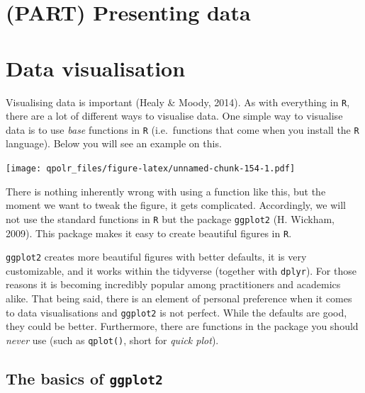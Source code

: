 \documentclass[12pt,oneside]{reedthesis}
\theoremstyle{definition}
\theoremstyle{definition}
\theoremstyle{definition}
\theoremstyle{remark}
\begin{document}
  \chapter*{(PART) Presenting data}\label{part-presenting-data}
  
  \chapter{Data visualisation}\label{dataviz}
  
  Visualising data is important (Healy \& Moody, 2014). As with everything
  in \texttt{R}, there are a lot of different ways to visualise data. One
  simple way to visualise data is to use \emph{base} functions in
  \texttt{R} (i.e.~functions that come when you install the \texttt{R}
  language). Below you will see an example on this.
  \begin{Shaded}
  \begin{Highlighting}[]
  \NormalTok{(}\OperatorTok{$}\OperatorTok{$}
  \end{Highlighting}
  \end{Shaded}
  \texttt{[image: qpolr\_files/figure-latex/unnamed-chunk-154-1.pdf]}
  
  There is nothing inherently wrong with using a function like this, but
  the moment we want to tweak the figure, it gets complicated.
  Accordingly, we will not use the standard functions in \texttt{R} but
  the package \texttt{ggplot2} (H. Wickham, 2009). This package makes it
  easy to create beautiful figures in \texttt{R}.
  
  \texttt{ggplot2} creates more beautiful figures with better defaults, it
  is very customizable, and it works within the tidyverse (together with
  \texttt{dplyr}). For those reasons it is becoming incredibly popular
  among practitioners and academics alike. That being said, there is an
  element of personal preference when it comes to data visualisations and
  \texttt{ggplot2} is not perfect. While the defaults are good, they could
  be better. Furthermore, there are functions in the package you should
  \emph{never} use (such as \texttt{qplot()}, short for \emph{quick
  plot}).
  
  \section{\texorpdfstring{The basics of
  \texttt{ggplot2}}{The basics of ggplot2}}\label{the-basics-of-ggplot2}
  
\end{document}
